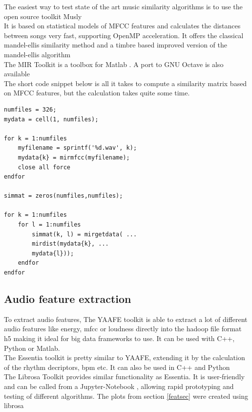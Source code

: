 The easiest way to test state of the art music similarity algorithms is to use the open source toolkit Musly \cite{musly1}\\ 
It is based on statistical models of MFCC features and calculates the distances between songs very fast, supporting OpenMP acceleration. It offers the classical mandel-ellis similarity method \cite{mandelellis1} and a timbre based improved version of the mandel-ellis algorithm \cite{musly2}\\
The MIR Toolkit \cite{mirtoolbox1} is a toolbox for Matlab \cite{matl1}. A port to GNU Octave \cite{octave1} is also available \cite{mirtoolbox2}\\
The short code snippet below is all it takes to compute a similarity matrix based on MFCC features, but the calculation takes quite some time.

\lstset{language=Matlab}          %

\FloatBarrier

\begin{lstlisting}[frame=single]  % Start your code-block
numfiles = 326;
mydata = cell(1, numfiles);

for k = 1:numfiles
	myfilename = sprintf('%d.wav', k);
	mydata{k} = mirmfcc(myfilename);
	close all force
endfor

simmat = zeros(numfiles,numfiles);

for k = 1:numfiles
	for l = 1:numfiles
		simmat(k, l) = mirgetdata( ...
		mirdist(mydata{k}, ...
		mydata{l}));
	endfor
endfor
\end{lstlisting}

\FloatBarrier

\subsection{Audio feature extraction}
To extract audio features, 
The YAAFE toolkit \cite{yaafe1} is able to extract a lot of different audio features like energy, mfcc or loudness directly into the hadoop file format h5 making it ideal for big data frameworks to use. It can be used with C++, Python or Matlab.\\
The Essentia toolkit \cite{essentia1} is pretty similar to YAAFE, extending it by the calculation of the rhythm decriptors, bpm etc. It can also be used in C++ and Python\\
The Librosa Toolkit provides similar functionality \cite{labrosa1} as Essentia. It is user-friendly and can be called from a Jupyter-Notebook \cite{jupyter}, allowing rapid prototyping and testing of different algorithms. The plots from section \ref{featsec} were created using librosa\\

